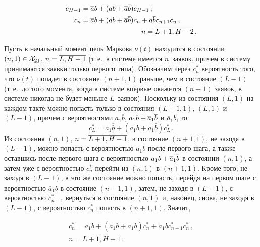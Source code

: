 \begin{multicols}{2}
\noindent
\begin{align}
\label{3.3}
c_{H-1} &= \overline{a} b + (a b + \overline{a} \overline{b}) c_{H-1}\,;
\\
c_n &= \overline{a} b + (a b + \overline{a} \overline{b}) c_{n}
+ a \overline{b} c_{n+1} c_n \,,\notag
\\
 &\hspace*{30mm}n=\overline{L+1,H-2}\,. \label{3.4}
\end{align}

Пусть в начальный момент цепь Маркова $\nu(t)$
находится в состоянии ${(n,1) \hm\in {\cal X}_{21}}$,
${n\hm=\overline{L,H-1}}$
(т.\,е.\ в системе имеется $n$~заявок, причем в
систему принимаются заявки только первого типа).
Обозначим через $c^*_n$ вероятность того,
что $\nu(t)$ попадет в состояние $(n+1,1)$ раньше,
чем в состояние ${(L-1)}$
(т.\,е.\ до того момента, когда в системе впервые
окажется ${(n+1)}$ заявок, в системе никогда не
будет меньше $L$~заявок).
Поскольку из состояния $(L,1)$ на каждом такте
можно попасть только в состояния ${(L+1,1)}$,
$(L,1)$ и $(L-1)$, причем с вероятностями
$a_1 \overline{b}$, ${a_1 b \hm+ \overline{a}_1 \overline{b}}$ и
$\overline{a}_1 b$, то
\begin{equation}
\label{3.5}
c^*_{L}= a_1 \overline{b} + (a_1 b + \overline{a}_1 \overline{b}) c^*_{L}\,.
\end{equation}
Из состояния $(n,1)$, ${n\hm=\overline{L+1,H-1}}$,
в состояние $(n+1,1)$, не заходя в ${(L-1)}$, можно попасть
с вероятностью $a_1 \overline{b}$ после первого
шага, а также оставшись после первого шага с
вероятностью ${a_1 b\hm + \overline{a}_1 \overline{b}}$ в состоянии
$(n,1)$, а затем уже с вероятностью $c^*_{n}$
пе\-рейти из $(n,1)$ в ${(n+1,1)}$.
Кроме того, не заходя в $(L-1)$, в это же
состояние можно попасть, пе\-рейдя на первом шаге
с вероятностью $\overline{a}_1 b$
в состояние $(n-1,1)$, затем, не заходя в $(L-1)$,
с вероятностью $c^*_{n-1}$ вернуться в состояние
$(n,1)$ и, наконец, снова, не заходя в $(L-1)$,
с вероятностью $c^*_{n}$ попасть в $(n+1,1)$.
Значит,

\noindent
\begin{multline}
\label{3.6}
c^*_n= a_1 \overline{b} + (a_1 b + \overline{a}_1 \overline{b}) c^*_n
+ \overline{a}_1 b c^*_{n-1} c^*_n \,,
\\
n=\overline{L+1,H-1}\,.
\end{multline}



\end{multicols}
